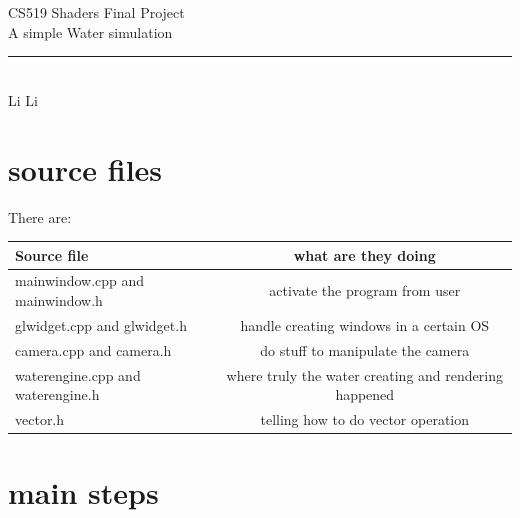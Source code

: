 \documentclass[12pt,letterpaper]{article}
\begin{document}
\begin{titlepage}
    \vspace*{4cm}
    \begin{flushleft}
    {\huge
        CS519 Shaders Final Project\\[.5cm]
    }
    {\large
        A simple Water simulation\\
	}
    \end{flushleft}
    \vfill
    \rule{5in}{.5mm}\\
    Li Li

\end{titlepage}
\section{source files}
There are:
\begin{tabular}{ |l | c |}
  \hline                       
  \textbf{Source file} & \textbf{what are they doing} \\ \hline
  mainwindow.cpp and mainwindow.h & activate the program from user\\ \hline
  glwidget.cpp and glwidget.h& handle creating windows in a certain OS \\ \hline
  camera.cpp and camera.h & do stuff to manipulate the camera  \\ \hline
  waterengine.cpp and waterengine.h & where truly  the water creating and rendering happened \\ \hline
  vector.h & telling how to do vector operation \\ \hline
\end{tabular}

\section{main steps}
\end{document}
